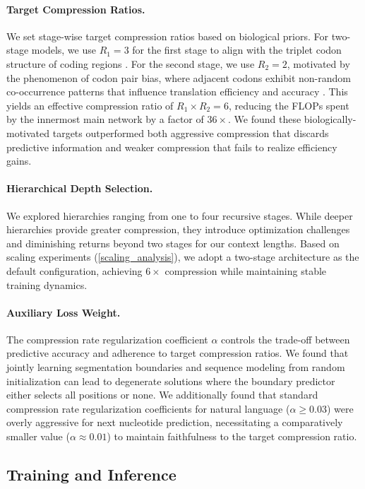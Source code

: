 \documentclass{article}
\theoremstyle{plain}
\theoremstyle{definition}
\theoremstyle{remark}
\begin{document}
\paragraph{Target Compression Ratios.}
We set stage-wise target compression ratios based on biological priors. For two-stage models, we use $R_1 = 3$ for the first stage to align with the triplet codon structure of coding regions \citep{Koonin2008}. For the second stage, we use $R_2 = 2$, motivated by the phenomenon of codon pair bias, where adjacent codons exhibit non-random co-occurrence patterns that influence translation efficiency and accuracy \citep{Gutman1989}. This yields an effective compression ratio of $R_1 \times R_2 = 6$, reducing the FLOPs spent by the innermost main network by a factor of $36\times$. We found these biologically-motivated targets outperformed both aggressive compression that discards predictive information and weaker compression that fails to realize efficiency gains.

\paragraph{Hierarchical Depth Selection.}
We explored hierarchies ranging from one to four recursive stages. While deeper hierarchies provide greater compression, they introduce optimization challenges and diminishing returns beyond two stages for our context lengths. Based on scaling experiments (\cref{scaling_analysis}), we adopt a two-stage architecture as the default configuration, achieving $6\times$ compression while maintaining stable training dynamics.

\paragraph{Auxiliary Loss Weight.}
The compression rate regularization coefficient $\alpha$ controls the trade-off between predictive accuracy and adherence to target compression ratios. We found that jointly learning segmentation boundaries and sequence modeling from random initialization can lead to degenerate solutions where the boundary predictor either selects all positions or none. We additionally found that standard compression rate regularization coefficients for natural language ($\alpha \geq 0.03$) were overly aggressive for next nucleotide prediction, necessitating a comparatively smaller value ($\alpha \approx 0.01$) to maintain faithfulness to the target compression ratio.


\subsection{Training and Inference}
\label{sec:training}
\end{document}
